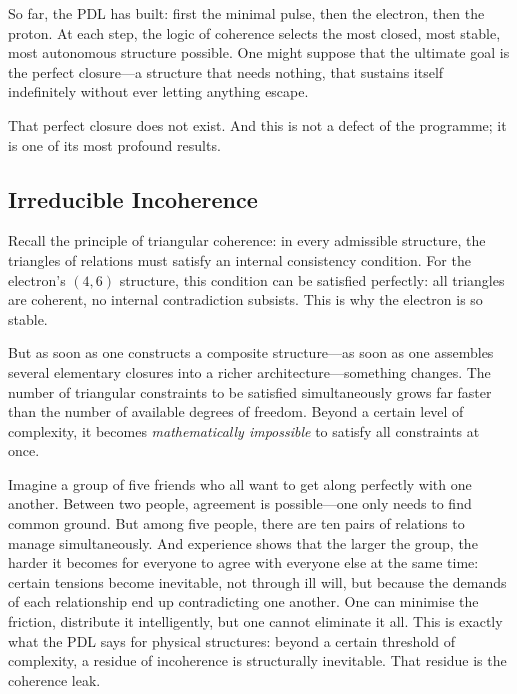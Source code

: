 \documentclass[12pt, a4paper, openright]{book}
\begin{document}
So far, the PDL has built: first the minimal pulse, then the electron, then the proton. At each step, the logic of coherence selects the most closed, most stable, most autonomous structure possible. One might suppose that the ultimate goal is the perfect closure---a structure that needs nothing, that sustains itself indefinitely without ever letting anything escape.

\medskip

That perfect closure does not exist. And this is not a defect of the programme; it is one of its most profound results.

\subsection*{Irreducible Incoherence}

Recall the principle of triangular coherence: in every admissible structure, the triangles of relations must satisfy an internal consistency condition. For the electron's $(4,6)$ structure, this condition can be satisfied perfectly: all triangles are coherent, no internal contradiction subsists. This is why the electron is so stable.

\medskip

But as soon as one constructs a composite structure---as soon as one assembles several elementary closures into a richer architecture---something changes. The number of triangular constraints to be satisfied simultaneously grows far faster than the number of available degrees of freedom. Beyond a certain level of complexity, it becomes \emph{mathematically impossible} to satisfy all constraints at once.

\medskip

Imagine a group of five friends who all want to get along perfectly with one another. Between two people, agreement is possible---one only needs to find common ground. But among five people, there are ten pairs of relations to manage simultaneously. And experience shows that the larger the group, the harder it becomes for everyone to agree with everyone else at the same time: certain tensions become inevitable, not through ill will, but because the demands of each relationship end up contradicting one another. One can minimise the friction, distribute it intelligently, but one cannot eliminate it all. This is exactly what the PDL says for physical structures: beyond a certain threshold of complexity, a residue of incoherence is structurally inevitable. That residue is the coherence leak.
\end{document}

